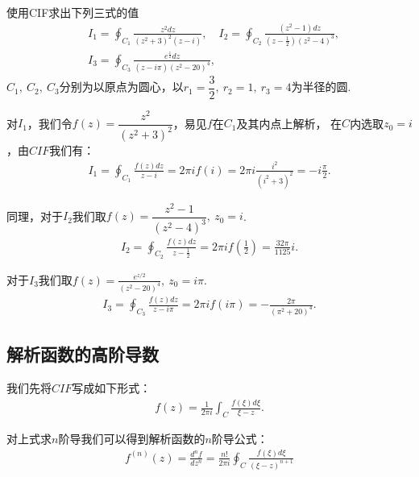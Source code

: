         \begin{example}
            使用CIF求出下列三式的值
            \begin{align*}
                &I_1 = \oint_{C_1}\frac{z^2dz}{(z^2+3)^2(z-i)},
                \quad I_2=\oint_{C_2}\frac{(z^2-1)dz}{(z-\frac{1}{2})(z^2-4)^3},\\
                &I_3=\oint_{C_3}\frac{e^{\frac{z}{2}}dz}{(z-i\pi)(z^2-20)^4},
            \end{align*}
            $C_1,\ C_2,\ C_3$分别为以原点为圆心，以$r_1=\dfrac{3}{2},\ r_2=1,\ r_3=4$为半径的圆.
        \end{example}
        \begin{solution}
            对$I_1$，我们令$f(z) = \dfrac{z^2}{(z^2+3)^2}$，易见$f$在$C_1$及其内点上解析，
            在$C$内选取$z_0 = i$，由$CIF$我们有：
            \begin{align*}
                I_1=\oint_{C_1}\frac{f(z)dz}{z-i}=2\pi i f(i)=2\pi i\frac{i^2}{(i^2+3)^2}=-i\frac{\pi}{2}.
            \end{align*}

            同理，对于$I_2$我们取$f(z) = \dfrac{z^2 - 1}{(z^2 - 4)^3},\ z_0 = i$.
            \begin{align*}
                I_2 = \oint_{C_2}\frac{f(z)dz}{z - \frac{1}{2}} = 2\pi i f(\frac{1}{2}) = \frac{32\pi}{1125}i.
            \end{align*}

            对于$I_3$我们取$f(z) = \frac{e^{z/2}}{(z^2 - 20)^4},\ z_0 = i\pi$.
            \begin{align*}
                I_3 = \oint_{C_3}\frac{f(z)dz}{z-i\pi}=2\pi i f(i\pi) = -\frac{2\pi}{(\pi^2+20)^4}.
            \end{align*}
        \end{solution}

    \subsection{解析函数的高阶导数}
        我们先将$CIF$写成如下形式：
        \begin{align*}
            f(z) = \frac{1}{2\pi i}\int_C \frac{f(\xi)d\xi}{\xi - z}.
        \end{align*}

        \begin{theorem}[解析函数的高阶导数]\label{the:analytic_function_derivative}
            对上式求$n$阶导我们可以得到解析函数的$n$阶导公式：
            \begin{align*}
                f^{(n)}(z) = \frac{d^n f}{dz^n} = \frac{n!}{2\pi i}\oint_C \frac{f(\xi)d\xi}{(\xi - z)^{n + 1}}
            \end{align*}
        \end{theorem}


